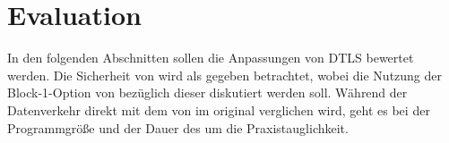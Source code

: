 \chapter{Evaluation}
\label{chp:evaluation}

In den folgenden Abschnitten sollen die Anpassungen von DTLS bewertet werden. Die Sicherheit von  wird als gegeben betrachtet, wobei
die Nutzung der Block-1-Option von  bezüglich dieser diskutiert werden soll. Während der Datenverkehr direkt mit dem von
 im original verglichen wird, geht es bei der Programmgröße und der Dauer des  um die Praxistauglichkeit.




